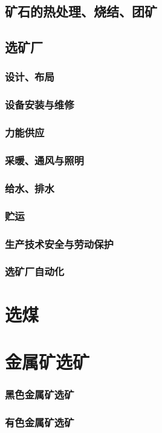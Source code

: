 \documentclass[UTF8]{../../ApplicationUniverse}
\begin{document}
    \subsection{矿石的热处理、烧结、团矿}
    \subsection{选矿厂}
        \subsubsection{设计、布局}
        \subsubsection{设备安装与维修}
        \subsubsection{力能供应}
        \subsubsection{采暖、通风与照明}
        \subsubsection{给水、排水}
        \subsubsection{贮运}
        \subsubsection{生产技术安全与劳动保护}
        \subsubsection{选矿厂自动化}
\section{选煤}
\section{金属矿选矿}
    \subsubsection{黑色金属矿选矿}
    \subsubsection{有色金属矿选矿}
\end{document}
